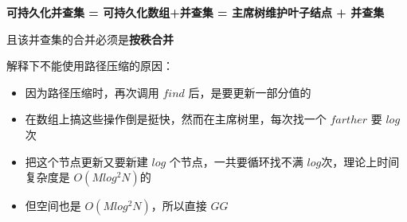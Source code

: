\documentclass[E:/GsjzTle/main/main.tex]{subfiles}
\begin{document}
\textbf{可持久化并查集 = 可持久化数组+并查集 = 主席树维护叶子结点 +
并查集}

且该并查集的合并必须是\textbf{按秩合并}

解释下不能使用路径压缩的原因：

\begin{itemize}
\item
  因为路径压缩时，再次调用 \(find\) 后，是要更新一部分值的
\item
  在数组上搞这些操作倒是挺快，然而在主席树里，每次找一个 \(farther\) 要
  \(log\) 次
\item
  把这个节点更新又要新建 \(log\) 个节点，一共要循环找不满
  \(log\)次，理论上时间复杂度是 \(O(Mlog^2N)\)的
\item
  但空间也是 \(O(Mlog^2N)\)，所以直接 \(GG\)
\end{itemize}
\end{document}

